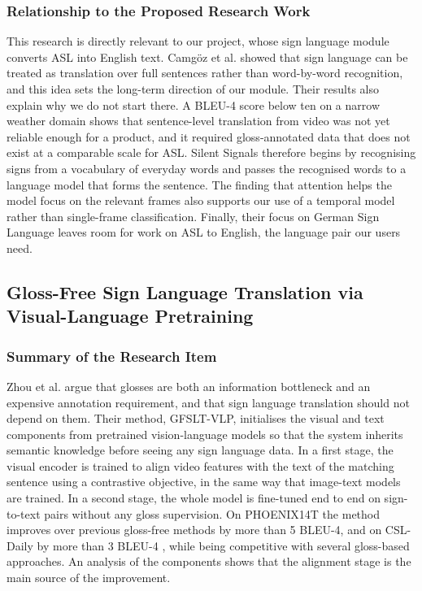 \documentclass{FastFyp}
\begin{document}
\subsubsection*{Relationship to the Proposed Research Work}
This research is directly relevant to our project, whose sign language module converts ASL into English text. Camg\"oz et al. \cite{ref:Camgoz:2018} showed that sign language can be treated as translation over full sentences rather than word-by-word recognition, and this idea sets the long-term direction of our module. Their results also explain why we do not start there. A BLEU-4 score below ten on a narrow weather domain shows that sentence-level translation from video was not yet reliable enough for a product, and it required gloss-annotated data that does not exist at a comparable scale for ASL. Silent Signals therefore begins by recognising signs from a vocabulary of everyday words and passes the recognised words to a language model that forms the sentence. The finding that attention helps the model focus on the relevant frames also supports our use of a temporal model rather than single-frame classification. Finally, their focus on German Sign Language leaves room for work on ASL to English, the language pair our users need.

\subsection{Gloss-Free Sign Language Translation via Visual-Language Pretraining}
\subsubsection*{Summary of the Research Item}
Zhou et al. \cite{ref:ZhouB:2023} argue that glosses are both an information bottleneck and an expensive annotation requirement, and that sign language translation should not depend on them. Their method, GFSLT-VLP, initialises the visual and text components from pretrained vision-language models so that the system inherits semantic knowledge before seeing any sign language data. In a first stage, the visual encoder is trained to align video features with the text of the matching sentence using a contrastive objective, in the same way that image-text models are trained. In a second stage, the whole model is fine-tuned end to end on sign-to-text pairs without any gloss supervision. On PHOENIX14T \cite{ref:Camgoz:2018} the method improves over previous gloss-free methods by more than 5 BLEU-4, and on CSL-Daily \cite{zhou2021csldaily} by more than 3 BLEU-4 \cite{ref:ZhouB:2023}, while being competitive with several gloss-based approaches. An analysis of the components shows that the alignment stage is the main source of the improvement.
\end{document}
